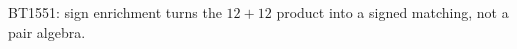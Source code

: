 \begin{center}\small
BT1551: sign enrichment turns the $12+12$ product into a signed matching, not a pair algebra.
\end{center}
